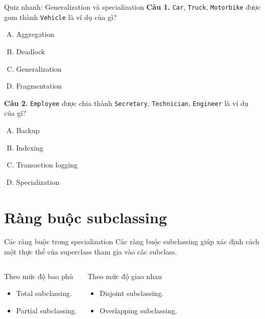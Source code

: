 \documentclass[aspectratio=169,11pt]{beamer}
\newcommand{\codeword}[1]{\texttt{#1}}
\begin{document}
\begin{frame}{Quiz nhanh: Generalization và specialization}
\textbf{Câu 1.} \codeword{Car}, \codeword{Truck}, \codeword{Motorbike} được gom thành \codeword{Vehicle} là ví dụ của gì?
\begin{enumerate}[A.]
    \item Aggregation
    \item Deadlock
    \item Generalization
    \item Fragmentation
\end{enumerate}
\vspace{0.2cm}
\textbf{Câu 2.} \codeword{Employee} được chia thành \codeword{Secretary}, \codeword{Technician}, \codeword{Engineer} là ví dụ của gì?
\begin{enumerate}[A.]
    \item Backup
    \item Indexing
    \item Transaction logging
    \item Specialization
\end{enumerate}
\end{frame}

\section{Ràng buộc subclassing}

\begin{frame}{Các ràng buộc trong specialization}
Các ràng buộc subclassing giúp xác định cách một thực thể của superclass tham gia vào các subclass.

\vspace{0.3cm}
\begin{columns}
\begin{block}{Theo mức độ bao phủ}
\begin{itemize}
    \item Total subclassing.
    \item Partial subclassing.
\end{itemize}
\end{block}

\begin{block}{Theo mức độ giao nhau}
\begin{itemize}
    \item Disjoint subclassing.
    \item Overlapping subclassing.
\end{itemize}
\end{block}
\end{columns}
\end{frame}
\end{document}
